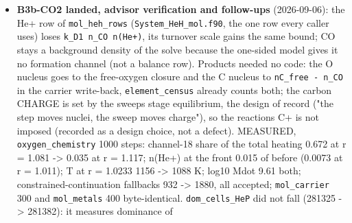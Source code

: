 \documentclass[english,a4paper]{my_memo}
\begin{document}
\begin{itemize}
  largest share of the total heating taken by channel 18 falls from 0.672 at
  r = 1.081 to 0.035 at r = 1.117, channel 18 at r = 1.0894 from 6.90e-7 to
  9.75e-9 erg cm\^{}-3 s\^{}-1, \texttt{n(He+)} there to 0.015 of its former value and to
  0.0073 at r = 1.011, \texttt{T} at r = 1.0233 from 1156.4 K to 1088.2 K, and
  \texttt{log10\ Mdot} stays 9.61 with exit 0. \texttt{dom\_cells\_HeP} does NOT fall
  (281325 -\textgreater{} 281382): the counter compares \texttt{k\_D1\ n\_CO} with recombination and
  still says this reaction is the leading He+ loss of the layer, so what it
  now reports is the operator split\textquotesingle s lag rather than a missing sink.
  \texttt{mol\_carrier} 300 steps and \texttt{mol\_metals} 400 steps byte-identical in every
  output file. Goldens not refreshed. Reported for owners elsewhere: the
  \texttt{dom\_cells\_HeP} header text in \texttt{write\_output.f90} 558-562 still says the
  frozen He+ "over-states that channel"; the mirror decomposition
  \texttt{hydrogen\_helium\_row\_terms} in \texttt{constrained\_chemical\_equilibrium.f90}
  needs the same term after line 1859 or it stops summing to row 2; the \texttt{n\_co}
  comment in \texttt{ion\_cell\_state.f90} still calls CO an equilibrium closure.
\item
  \textbf{B3b-CO2 landed, advisor verification and follow-ups} (2026-09-06): the
  He+ row of \texttt{mol\_heh\_rows} (\texttt{System\_HeH\_mol.f90}, the one row every caller
  uses) loses \texttt{k\_D1\ n\_CO\ n(He+)}, its turnover scale gains the same bound;
  CO stays a background density of the solve because the one-sided model
  gives it no formation channel (not a balance row). Products needed no
  code: the O nucleus goes to the free-oxygen closure and the C nucleus to
  \texttt{nC\_free\ -\ n\_CO} in the carrier write-back, \texttt{element\_census} already counts
  both; the carbon CHARGE is set by the sweep\textquotesingle s stage equilibrium, the
  design of record ("the step moves nuclei, the sweep moves charge"), so the
  reaction\textquotesingle s C+ is not imposed (recorded as a design choice, not a defect).
  MEASURED, \texttt{oxygen\_chemistry} 1000 steps: channel-18 share of the total
  heating 0.672 at r = 1.081 -\textgreater{} 0.035 at r = 1.117; n(He+) at the front
  0.015 of before (0.0073 at r = 1.011); T at r = 1.0233 1156 -\textgreater{} 1088 K;
  log10 Mdot 9.61 both; constrained-continuation fallbacks 932 -\textgreater{} 1880, all
  accepted; \texttt{mol\_carrier} 300 and \texttt{mol\_metals} 400 byte-identical.
  \texttt{dom\_cells\_HeP} did not fall (281325 -\textgreater{} 281382): it measures dominance of

\end{itemize}
\end{document}

